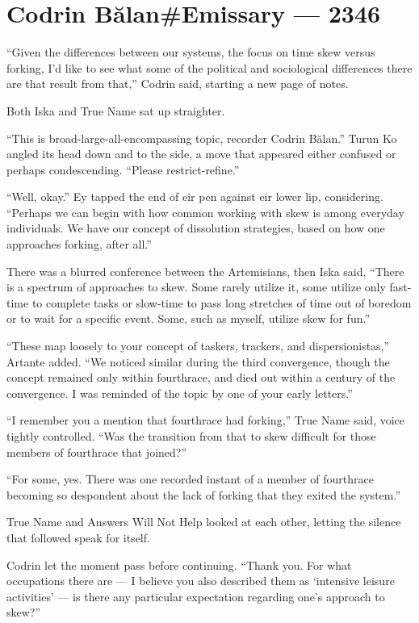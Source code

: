 \hypertarget{codrin-bux103lanemissary-2346}{%
\chapter{Codrin Bălan\#Emissary — 2346}\label{codrin-bux103lanemissary-2346}}

``Given the differences between our systems, the focus on time skew versus forking, I'd like to see what some of the political and sociological differences there are that result from that,'' Codrin said, starting a new page of notes.

Both Iska and True Name sat up straighter.

``This is broad-large-all-encompassing topic, recorder Codrin Bălan.'' Turun Ko angled its head down and to the side, a move that appeared either confused or perhaps condescending. ``Please restrict-refine.''

``Well, okay.'' Ey tapped the end of eir pen against eir lower lip, considering. ``Perhaps we can begin with how common working with skew is among everyday individuals. We have our concept of dissolution strategies, based on how one approaches forking, after all.''

There was a blurred conference between the Artemisians, then Iska said, ``There is a spectrum of approaches to skew. Some rarely utilize it, some utilize only fast-time to complete tasks or slow-time to pass long stretches of time out of boredom or to wait for a specific event. Some, such as myself, utilize skew for fun.''

``These map loosely to your concept of taskers, trackers, and dispersionistas,'' Artante added. ``We noticed similar during the third convergence, though the concept remained only within fourthrace, and died out within a century of the convergence. I was reminded of the topic by one of your early letters.''

``I remember you a mention that fourthrace had forking,'' True Name said, voice tightly controlled. ``Was the transition from that to skew difficult for those members of fourthrace that joined?''

``For some, yes. There was one recorded instant of a member of fourthrace becoming so despondent about the lack of forking that they exited the system.''

True Name and Answers Will Not Help looked at each other, letting the silence that followed speak for itself.

Codrin let the moment pass before continuing. ``Thank you. For what occupations there are — I believe you also described them as `intensive leisure activities' — is there any particular expectation regarding one's approach to skew?''

